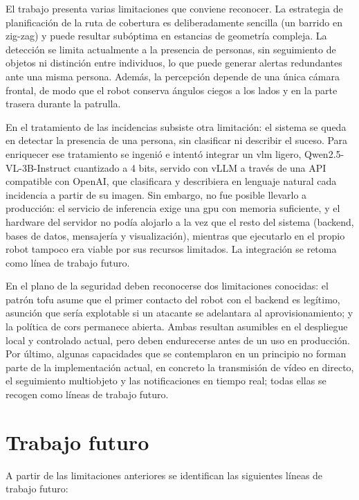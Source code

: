 El trabajo presenta varias limitaciones que conviene reconocer. La estrategia de
planificación de la ruta de cobertura es deliberadamente sencilla (un barrido en zig-zag) y
puede resultar subóptima en estancias de geometría compleja. La detección se limita
actualmente a la presencia de personas, sin seguimiento de objetos ni distinción entre
individuos, lo que puede generar alertas redundantes ante una misma persona. Además, la
percepción depende de una única cámara frontal, de modo que el robot conserva ángulos ciegos
a los lados y en la parte trasera durante la patrulla.

En el tratamiento de las incidencias subsiste otra limitación: el sistema se queda en
detectar la presencia de una persona, sin clasificar ni describir el suceso. Para
enriquecer ese tratamiento se ingenió e intentó integrar un \gls{vlm} ligero,
Qwen2.5-VL-3B-Instruct cuantizado a 4 bits, servido con vLLM a través de una API
compatible con OpenAI, que clasificara y describiera en lenguaje
natural cada incidencia a partir de su imagen. Sin embargo, no fue posible llevarlo a
producción: el servicio de inferencia exige una \acrshort{gpu} con memoria suficiente, y el
hardware del servidor no podía alojarlo a la vez que el resto del sistema (backend, bases de
datos, mensajería y visualización), mientras que ejecutarlo en el propio robot tampoco era
viable por sus recursos limitados. La integración se retoma como línea de trabajo futuro.

En el plano de la seguridad deben reconocerse dos limitaciones conocidas: el patrón
\gls{tofu} asume que el primer contacto del robot con el backend es legítimo, asunción que
sería explotable si un atacante se adelantara al aprovisionamiento; y la política de
\gls{cors} permanece abierta. Ambas resultan asumibles en el despliegue local y controlado
actual, pero deben endurecerse antes de un uso en producción. Por último, algunas
capacidades que se contemplaron en un principio no forman parte de la implementación actual,
en concreto la transmisión de vídeo en directo, el seguimiento multiobjeto y las
notificaciones en tiempo real; todas ellas se recogen como líneas de trabajo futuro.

\section{Trabajo futuro}
\label{sec:trabajo-futuro}

A partir de las limitaciones anteriores se identifican las siguientes líneas de trabajo
futuro:

